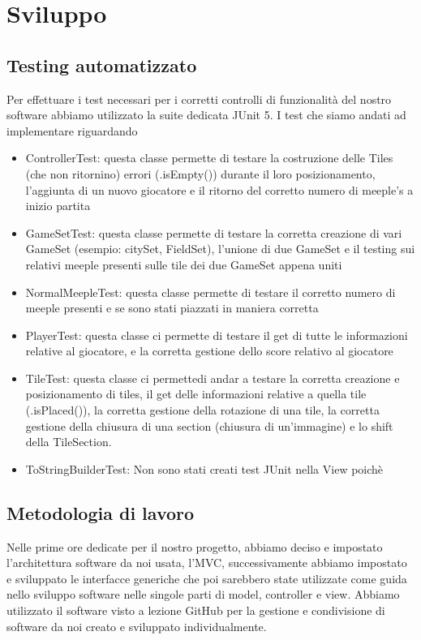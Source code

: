 \section{Sviluppo}
\subsection{Testing automatizzato}
Per effettuare i test necessari per i corretti controlli di funzionalità del nostro software abbiamo utilizzato la suite dedicata JUnit 5. I test che siamo andati ad implementare riguardando
\begin{itemize}
    \item ControllerTest: questa classe permette di testare la costruzione delle Tiles (che non ritornino) errori (.isEmpty()) durante il loro posizionamento, l'aggiunta di un nuovo giocatore e il ritorno del corretto numero di meeple's a inizio partita
    \item GameSetTest: questa classe permette di testare la corretta creazione di vari GameSet (esempio: citySet, FieldSet), l'unione di due GameSet e il testing sui relativi meeple presenti sulle tile dei due GameSet appena uniti 
    \item NormalMeepleTest: questa classe permette di testare il corretto numero di meeple presenti e se sono stati piazzati in maniera corretta
    \item PlayerTest: questa classe ci permette di testare il get di tutte le informazioni relative al giocatore, e la corretta gestione dello score relativo al giocatore
    \item TileTest: questa classe ci permettedi andar a testare la corretta creazione e posizionamento di tiles, il get delle informazioni relative a quella tile (.isPlaced()), la corretta gestione della rotazione di una tile, la corretta gestione della chiusura di una section (chiusura di un'immagine) e lo shift della TileSection.
    \item ToStringBuilderTest:
    Non sono stati creati test JUnit nella View poichè 
\end{itemize}

\subsection{Metodologia di lavoro}
Nelle prime ore dedicate per il nostro progetto, abbiamo deciso e impostato l'architettura software da noi usata, l'MVC, successivamente abbiamo impostato e sviluppato le interfacce generiche che poi sarebbero state utilizzate come guida nello sviluppo software nelle singole parti di model, controller e view. Abbiamo utilizzato il software visto a lezione GitHub per la gestione e condivisione di software da noi creato e sviluppato individualmente.
